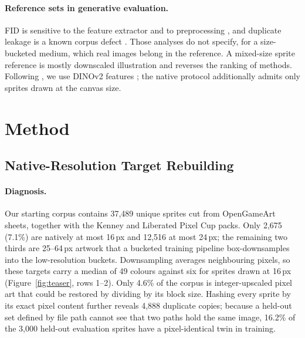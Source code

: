 \documentclass{article} %
\begin{document}
\paragraph{Reference sets in generative evaluation.}
FID is sensitive to the feature extractor and to preprocessing \citep{Heusel2017,Parmar2022,Stein2023}, and duplicate
leakage is a known corpus defect \citep{Barz2020,Webster2023,Torralba2011}. Those analyses do not specify, for a
size-bucketed medium, which real images belong in the reference. A mixed-size sprite reference is mostly downscaled
illustration and reverses the ranking of methods. Following \citet{Stein2023}, we use DINOv2 features
\citep{Oquab2023}; the native protocol additionally admits only sprites drawn at the canvas size.

\section{Method}
\label{sec:method}

\subsection{Native-Resolution Target Rebuilding}
\label{sec:data}

\paragraph{Diagnosis.}
Our starting corpus contains 37{,}489 unique sprites cut from OpenGameArt \citep{OpenGameArt} sheets, together with the
Kenney and Liberated Pixel Cup packs. Only 2{,}675 (7.1\%) are natively at most 16\,px and 12{,}516 at most 24\,px; the
remaining two thirds are 25--64\,px artwork that a bucketed training pipeline box-downsamples into the low-resolution
buckets. Downsampling averages
neighbouring pixels, so these targets carry a median of 49 colours against six for sprites drawn at 16\,px
(Figure~\ref{fig:teaser}, rows 1--2). Only 4.6\% of the corpus is integer-upscaled pixel art that could be restored by
dividing by its block size. Hashing every sprite by its exact
pixel content further reveals 4{,}888 duplicate copies; because a held-out set defined by file path cannot see that two
paths hold the same image, 16.2\% of the 3{,}000 held-out evaluation sprites have a pixel-identical twin in training.
\end{document}
